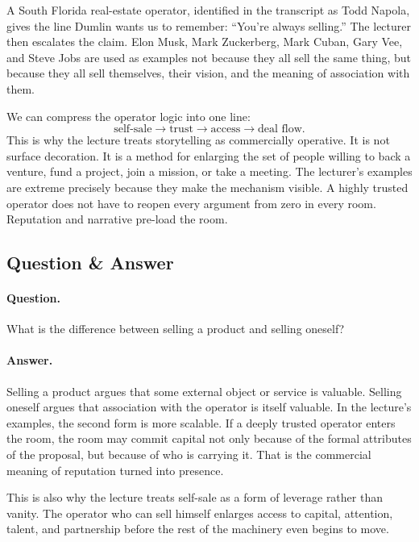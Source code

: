 A South Florida real-estate operator, identified in the transcript as Todd Napola, gives the line Dumlin wants us to remember: ``You're always selling.'' The lecturer then escalates the claim. Elon Musk, Mark Zuckerberg, Mark Cuban, Gary Vee, and Steve Jobs are used as examples not because they all sell the same thing, but because they all sell themselves, their vision, and the meaning of association with them.

We can compress the operator logic into one line:
\begin{equation}
\text{self-sale} \to \text{trust} \to \text{access} \to \text{deal flow}.
\end{equation}
This is why the lecture treats storytelling as commercially operative. It is not surface decoration. It is a method for enlarging the set of people willing to back a venture, fund a project, join a mission, or take a meeting. The lecturer's examples are extreme precisely because they make the mechanism visible. A highly trusted operator does not have to reopen every argument from zero in every room. Reputation and narrative pre-load the room.

\subsection{Question \& Answer}

\paragraph{Question.} What is the difference between selling a product and selling oneself?

\paragraph{Answer.} Selling a product argues that some external object or service is valuable. Selling oneself argues that association with the operator is itself valuable. In the lecture's examples, the second form is more scalable. If a deeply trusted operator enters the room, the room may commit capital not only because of the formal attributes of the proposal, but because of who is carrying it. That is the commercial meaning of reputation turned into presence.

This is also why the lecture treats self-sale as a form of leverage rather than vanity. The operator who can sell himself enlarges access to capital, attention, talent, and partnership before the rest of the machinery even begins to move.


